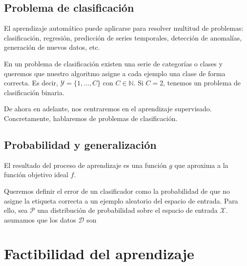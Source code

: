 \subsection{Problema de clasificación}
El aprendizaje automático puede aplicarse para resolver multitud de problemas: clasificación, regresión, predicción de series temporales, detección de anomalías, generación de nuevos datos, etc.

En un problema de clasificación existen una serie de categorías o clases y queremos que nuestro algoritmo asigne a cada ejemplo una clase de forma correcta. Es decir, $\mathcal{Y} = \{ 1, \ldots, C\}$ con $C \in \mathbb{N}$. Si $C=2$, tenemos un problema de clasificación binaria. 

De ahora en adelante, nos centraremos en el aprendizaje supervisado. Concretamente, hablaremos de problemas de clasificación. 

\subsection{Probabilidad y generalización}
El resultado del proceso de aprendizaje es una función $g$ que aproxima a la función objetivo ideal $f$. 

Queremos definir el error de un clasificador como la probabilidad de que no asigne la etiqueta correcta a un ejemplo aleatorio del espacio de entrada. Para ello, sea $\mathcal{P}$ una distribución de probabilidad sobre el espacio de entrada $\mathcal{X}$.  asumamos que los datos $\mathcal{D}$ son 

\section{Factibilidad del aprendizaje}

\section{}
